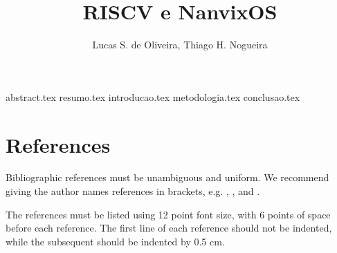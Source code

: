 \documentclass[12pt]{article}
\title{RISCV e NanvixOS}
\author{Lucas S. de Oliveira\inst{1}, Thiago H. Nogueira\inst{1}}
\begin{document}
    \maketitle

    {abstract.tex}
    {resumo.tex}
    {introducao.tex}
    {metodologia.tex}
    {conclusao.tex}

    \section{References}

    Bibliographic references must be unambiguous and uniform.  We recommend giving
    the author names references in brackets, e.g. \cite{knuth:84},
    \cite{boulic:91}, and \cite{smith:99}.
    
    The references must be listed using 12 point font size, with 6 points of space
    before each reference. The first line of each reference should not be
    indented, while the subsequent should be indented by 0.5 cm.
    
    
    
\end{document}
